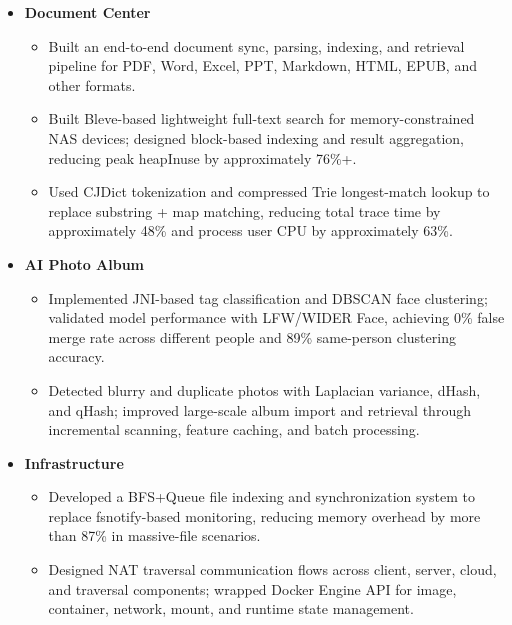 \documentclass{resume}
\begin{document}
\begin{itemize}
    \item \textbf{Document Center}
    \begin{itemize}
        \item Built an end-to-end document sync, parsing, indexing, and retrieval pipeline for PDF, Word, Excel, PPT, Markdown, HTML, EPUB, and other formats.
        \item Built Bleve-based lightweight full-text search for memory-constrained NAS devices; designed block-based indexing and result aggregation, reducing peak heapInuse by approximately 76\%+.
        \item Used CJDict tokenization and compressed Trie longest-match lookup to replace substring + map matching, reducing total trace time by approximately 48\% and process user CPU by approximately 63\%.
    \end{itemize}

    \item \textbf{AI Photo Album}
    \begin{itemize}
        \item Implemented JNI-based tag classification and DBSCAN face clustering; validated model performance with LFW/WIDER Face, achieving 0\% false merge rate across different people and 89\% same-person clustering accuracy.
        \item Detected blurry and duplicate photos with Laplacian variance, dHash, and qHash; improved large-scale album import and retrieval through incremental scanning, feature caching, and batch processing.
    \end{itemize}

    \item \textbf{Infrastructure}
    \begin{itemize}
        \item Developed a BFS+Queue file indexing and synchronization system to replace fsnotify-based monitoring, reducing memory overhead by more than 87\% in massive-file scenarios.
        \item Designed NAT traversal communication flows across client, server, cloud, and traversal components; wrapped Docker Engine API for image, container, network, mount, and runtime state management.
    \end{itemize}
\end{itemize}
\end{document}
